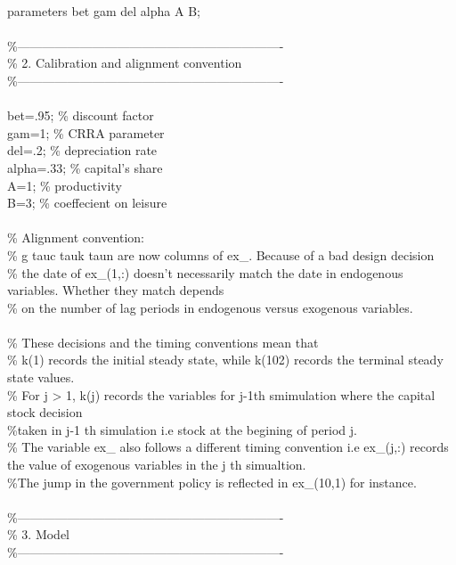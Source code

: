 \documentclass[a4paper,12pt]{scrartcl} %
\begin{document}
\\
parameters bet gam del alpha A B;\\
\\
\%----------------------------------------------------------------\\
\% 2. Calibration and alignment convention\\
\%----------------------------------------------------------------\\
\\
bet=.95;  \% discount factor\\
gam=1;    \% CRRA parameter\\
del=.2;  \% depreciation rate\\
alpha=.33; \%  capital's share\\
A=1;    \% productivity\\
B=3; \% coeffecient on leisure\\
\\
\% Alignment convention:\\
\% g tauc tauk taun are now columns of ex\_. Because of a bad design decision\\
\% the date of ex\_(1,:) doesn't necessarily match the date in endogenous variables. Whether they match depends\\
\% on the number of lag periods in endogenous versus exogenous variables.\\
\\
\% These decisions and the timing conventions mean that\\
\% k(1) records the initial steady state, while k(102) records the terminal steady state values.\\
\% For j > 1, k(j) records the variables for j-1th smimulation where the capital stock decision\\
\%taken in j-1 th simulation i.e stock at the begining of period j.\\
\% The variable ex\_ also follows a different timing convention i.e ex\_(j,:) records the value of exogenous variables in the j th simualtion.\\
\%The jump in the government policy is reflected in ex\_(10,1) for instance.\\
\\
\%----------------------------------------------------------------\\
\% 3. Model\\
\%----------------------------------------------------------------\\
\\
\end{document}
